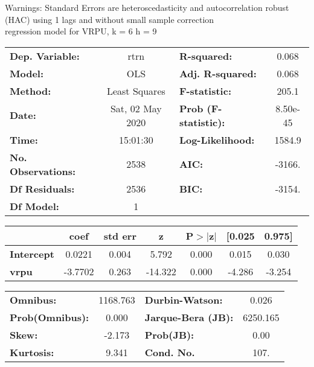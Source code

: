 Warnings: \newline
 [1] Standard Errors are heteroscedasticity and autocorrelation robust (HAC) using 1 lags and without small sample correction\\ 

regression model for VRPU, k = 6 h = 9\begin{center}
\begin{tabular}{lclc}
\toprule
\textbf{Dep. Variable:}    &       rtrn       & \textbf{  R-squared:         } &     0.068   \\
\textbf{Model:}            &       OLS        & \textbf{  Adj. R-squared:    } &     0.068   \\
\textbf{Method:}           &  Least Squares   & \textbf{  F-statistic:       } &     205.1   \\
\textbf{Date:}             & Sat, 02 May 2020 & \textbf{  Prob (F-statistic):} &  8.50e-45   \\
\textbf{Time:}             &     15:01:30     & \textbf{  Log-Likelihood:    } &    1584.9   \\
\textbf{No. Observations:} &        2538      & \textbf{  AIC:               } &    -3166.   \\
\textbf{Df Residuals:}     &        2536      & \textbf{  BIC:               } &    -3154.   \\
\textbf{Df Model:}         &           1      & \textbf{                     } &             \\
\bottomrule
\end{tabular}
\begin{tabular}{lcccccc}
                   & \textbf{coef} & \textbf{std err} & \textbf{z} & \textbf{P$> |$z$|$} & \textbf{[0.025} & \textbf{0.975]}  \\
\midrule
\textbf{Intercept} &       0.0221  &        0.004     &     5.792  &         0.000        &        0.015    &        0.030     \\
\textbf{vrpu}      &      -3.7702  &        0.263     &   -14.322  &         0.000        &       -4.286    &       -3.254     \\
\bottomrule
\end{tabular}
\begin{tabular}{lclc}
\textbf{Omnibus:}       & 1168.763 & \textbf{  Durbin-Watson:     } &    0.026  \\
\textbf{Prob(Omnibus):} &   0.000  & \textbf{  Jarque-Bera (JB):  } & 6250.165  \\
\textbf{Skew:}          &  -2.173  & \textbf{  Prob(JB):          } &     0.00  \\
\textbf{Kurtosis:}      &   9.341  & \textbf{  Cond. No.          } &     107.  \\
\bottomrule
\end{tabular}
\end{center}

